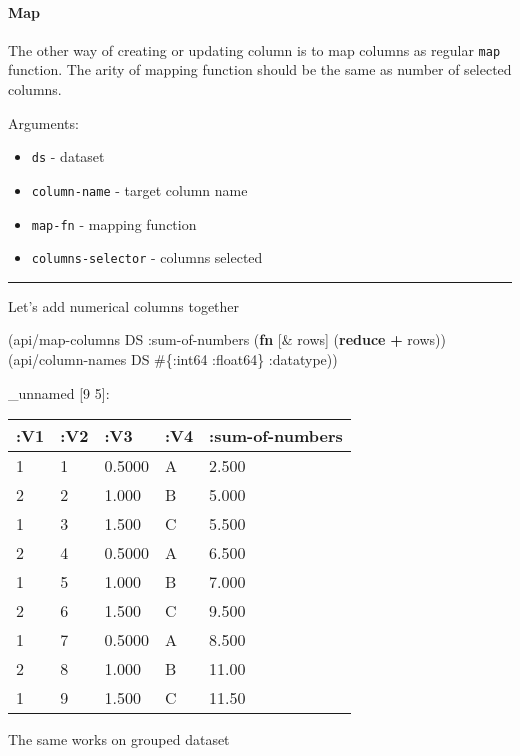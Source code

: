 \documentclass[]{article}
\newenvironment{Shaded}{\begin{snugshade}}{\end{snugshade}}
\newcommand{\KeywordTok}[1]{\textcolor[rgb]{0.13,0.29,0.53}{\textbf{#1}}}
\newcommand{\AttributeTok}[1]{\textcolor[rgb]{0.77,0.63,0.00}{#1}}
\newcommand{\NormalTok}[1]{#1}
\providecommand{\tightlist}{%
  \setlength{\itemsep}{0pt}\setlength{\parskip}{0pt}}
\let\oldparagraph\paragraph
\renewcommand{\paragraph}[1]{\oldparagraph{#1}\mbox{}}
\begin{document}
\paragraph{Map}\label{map}

The other way of creating or updating column is to map columns as
regular \texttt{map} function. The arity of mapping function should be
the same as number of selected columns.

Arguments:

\begin{itemize}
\tightlist
\item
  \texttt{ds} - dataset
\item
  \texttt{column-name} - target column name
\item
  \texttt{map-fn} - mapping function
\item
  \texttt{columns-selector} - columns selected
\end{itemize}

\begin{center}\rule{0.5\linewidth}{0.5pt}\end{center}

Let's add numerical columns together

\begin{Shaded}
\begin{Highlighting}[]
\NormalTok{(api/map-columns DS }\AttributeTok{:sum-of-numbers}\NormalTok{ (}\KeywordTok{fn}\NormalTok{ [& rows]}
\NormalTok{                                      (}\KeywordTok{reduce} \KeywordTok{+}\NormalTok{ rows)) (api/column-names DS  #\{}\AttributeTok{:int64} \AttributeTok{:float64}\NormalTok{\} }\AttributeTok{:datatype}\NormalTok{))}
\end{Highlighting}
\end{Shaded}

\_unnamed {[}9 5{]}:

\begin{longtable}[]{@{}lllll@{}}
\toprule
:V1 & :V2 & :V3 & :V4 & :sum-of-numbers\tabularnewline
\midrule
\endhead
1 & 1 & 0.5000 & A & 2.500\tabularnewline
2 & 2 & 1.000 & B & 5.000\tabularnewline
1 & 3 & 1.500 & C & 5.500\tabularnewline
2 & 4 & 0.5000 & A & 6.500\tabularnewline
1 & 5 & 1.000 & B & 7.000\tabularnewline
2 & 6 & 1.500 & C & 9.500\tabularnewline
1 & 7 & 0.5000 & A & 8.500\tabularnewline
2 & 8 & 1.000 & B & 11.00\tabularnewline
1 & 9 & 1.500 & C & 11.50\tabularnewline
\bottomrule
\end{longtable}

The same works on grouped dataset
\end{document}
